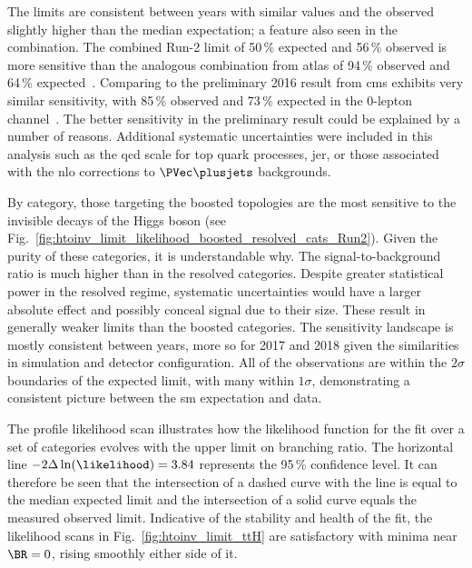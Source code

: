 The limits are consistent between years with similar values and the observed slightly higher than the median expectation; a feature also seen in the combination. The combined Run-2 limit of 50\,\% expected and 56\,\% observed is more sensitive than the analogous combination from \acrshort{atlas} of 94\,\% observed and 64\,\% expected~\cite{ATLAS:2020kdi}. Comparing to the preliminary 2016 result from \acrshort{cms} exhibits very similar sensitivity, with 85\,\% observed and 73\,\% expected in the 0-lepton channel~\cite{CMS-PAS-HIG-18-008}. The better sensitivity in the preliminary result could be explained by a number of reasons. Additional systematic uncertainties were included in this analysis such as the \acrshort{qcd} scale for top quark processes, \acrlong{jer}, or those associated with the \acrshort{nlo} corrections to $\PVec \plusjets$ backgrounds.

By category, those targeting the boosted topologies are the most sensitive to the invisible decays of the Higgs boson (see Fig.~\ref{fig:htoinv_limit_likelihood_boosted_resolved_cats_Run2}). Given the purity of these categories, it is understandable why. The signal-to-background ratio is much higher than in the resolved categories. Despite greater statistical power in the resolved regime, systematic uncertainties would have a larger absolute effect and possibly conceal signal due to their size. These result in generally weaker limits than the boosted categories. The sensitivity landscape is mostly consistent between years, more so for 2017 and 2018 given the similarities in simulation and detector configuration. All of the observations are within the $\text{2}\sigma$ boundaries of the expected limit, with many within $\text{1}\sigma$, demonstrating a consistent picture between the \acrshort{sm} expectation and data.

The profile likelihood scan illustrates how the likelihood function for the fit over a set of categories evolves with the upper limit on branching ratio. The horizontal line $-\text{2}\Delta \ln(\likelihood) = \text{3.84}$ represents the 95\,\% confidence level. It can therefore be seen that the intersection of a dashed curve with the line is equal to the median expected limit and the intersection of a solid curve equals the measured observed limit. Indicative of the stability and health of the fit, the likelihood scans in Fig.~\ref{fig:htoinv_limit_ttH} are satisfactory with minima near $\BR = \text{0}$, rising smoothly either side of it.

\clearpage


